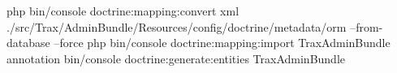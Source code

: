 php bin/console doctrine:mapping:convert xml   ./src/Trax/AdminBundle/Resources/config/doctrine/metadata/orm --from-database --force
php bin/console doctrine:mapping:import TraxAdminBundle annotation
bin/console doctrine:generate:entities TraxAdminBundle

